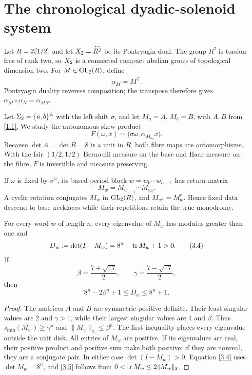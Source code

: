 \section{The chronological dyadic-solenoid system}
\label{sec:system}

Let \(R=\mathbb{Z}[1/2]\) and let \(X_2=\widehat{R^2}\) be its Pontryagin dual.
The group \(R^2\) is torsion-free of rank two, so \(X_2\) is a connected
compact abelian group of topological dimension two.  For
\(M\in\operatorname{GL}_2(R)\), define
\[
 \alpha_M=\widehat{M^{\mathsf T}}.
 \tag{3.1}\label{3.1}
\]
Pontryagin duality reverses composition; the transpose therefore gives
\(\alpha_M\circ\alpha_N=\alpha_{MN}\).

Let \(\Sigma_2=\{a,b\}^{\mathbb{Z}}\) with the left shift \(\sigma\), and let
\(M_a=A\), \(M_b=B\), with \(A,B\) from \eqref{1.1}.  We study the
autonomous skew product
\[
 F(\omega,x)=\bigl(\sigma\omega,\alpha_{M_{\omega_0}}x\bigr).
 \tag{3.2}\label{3.2}
\]
Because \(\det A=\det B=8\) is a unit in \(R\), both fibre maps are
automorphisms.  With the fair \((1/2,1/2)\) Bernoulli measure on the base and
Haar measure on the
fibre, \(F\) is invertible and measure preserving.

If \(\omega\) is fixed by \(\sigma^n\), its based period block
\(w=w_0\cdots w_{n-1}\) has return matrix
\[
 M_w=M_{w_{n-1}}\cdots M_{w_0}.
 \tag{3.3}\label{3.3}
\]
A cyclic rotation conjugates \(M_w\) in \(\operatorname{GL}_2(R)\), and
\(M_{w^r}=M_w^r\).  Hence fixed data descend to base necklaces while their
repetitions retain the true monodromy.

\begin{proposition}
\label{prop:expansion}
For every word \(w\) of length \(n\), every eigenvalue of \(M_w\) has
modulus greater than one and
\[
 D_w:=\det(I-M_w)=8^n-\operatorname{tr} M_w+1>0.
 \tag{3.4}\label{3.4}
\]
If
\[
 \beta=\frac{7+\sqrt{17}}2,
 \qquad
 \gamma=\frac{7-\sqrt{17}}2,
\]
then
\[
 8^n-2\beta^n+1\le D_w\le8^n+1.
 \tag{3.5}\label{3.5}
\]
\end{proposition}

\begin{proof}
The matrices \(A\) and \(B\) are symmetric positive definite.  Their least
singular values are \(2\) and \(\gamma>1\), while their largest singular
values are \(4\) and \(\beta\).  Thus
\(s_{\min}(M_w)\ge\gamma^n\) and \(\lVert M_w\rVert_2\le\beta^n\).
The first inequality places every eigenvalue outside the unit disk.  All
entries of \(M_w\) are positive.  If its eigenvalues are real, their positive
product and positive sum make both positive; if they are nonreal, they are a
conjugate pair.  In either case \(\det(I-M_w)>0\).  Equation \eqref{3.4}
uses \(\det M_w=8^n\), and \eqref{3.5} follows from
\(0<\operatorname{tr} M_w\le2\lVert M_w\rVert_2\).
\end{proof}

